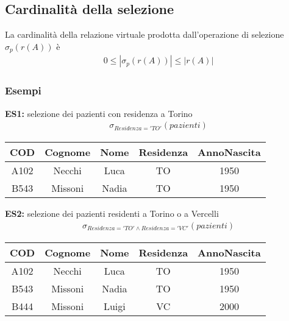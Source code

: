 \subsection{Cardinalità della selezione}
La cardinalità della relazione virtuale prodotta dall'operazione di selezione $\sigma_p(r(A))$ è 
    \begin{equation}\begin{aligned}
        0 \leq |\sigma_{p}(r(A))| \leq |r(A)|
    \end{aligned}\end{equation}

\subsubsection{Esempi}
\textbf{ES1:} selezione dei pazienti con residenza a Torino
    \begin{equation}\begin{aligned}
        \sigma_{Residenza = 'TO'}(pazienti)
    \end{aligned}\end{equation}
    \begin{center}\begin{tabular}{|c|c|c|c|c|} \hline
        \textbf{COD} & \textbf{Cognome} & \textbf{Nome} 
        & \textbf{Residenza} & \textbf{AnnoNascita}\\
        \hline
        A102 & Necchi & Luca & TO & 1950\\
        \hline
        B543 & Missoni & Nadia & TO & 1950\\
        \hline
    \end{tabular}\end{center}
\textbf{ES2:} selezione dei pazienti residenti a Torino o a Vercelli
    \begin{equation}\begin{aligned}
        \sigma_{Residenza = 'TO' \wedge Residenza = 'VC'}(pazienti)
    \end{aligned}\end{equation}
    \begin{center}\begin{tabular}{|c|c|c|c|c|} \hline
        \textbf{COD} & \textbf{Cognome} & \textbf{Nome} 
        & \textbf{Residenza} & \textbf{AnnoNascita}\\ \hline
        A102 & Necchi & Luca & TO & 1950\\ \hline
        B543 & Missoni & Nadia & TO & 1950\\ \hline
        B444 & Missoni & Luigi & VC & 2000\\ \hline
    \end{tabular}\end{center}
